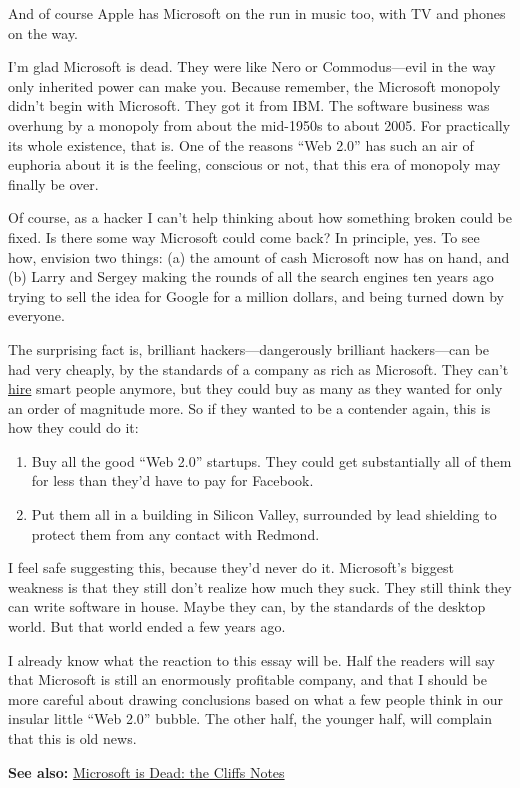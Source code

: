 And of course Apple has Microsoft on the run in music too, with TV and
phones on the way.

I'm glad Microsoft is dead. They were like Nero or Commodus---evil in
the way only inherited power can make you. Because remember, the
Microsoft monopoly didn't begin with Microsoft. They got it from IBM.
The software business was overhung by a monopoly from about the
mid-1950s to about 2005. For practically its whole existence, that is.
One of the reasons ``Web 2.0'' has such an air of euphoria about it is
the feeling, conscious or not, that this era of monopoly may finally be
over.

Of course, as a hacker I can't help thinking about how something broken
could be fixed. Is there some way Microsoft could come back? In
principle, yes. To see how, envision two things: (a) the amount of cash
Microsoft now has on hand, and (b) Larry and Sergey making the rounds of
all the search engines ten years ago trying to sell the idea for Google
for a million dollars, and being turned down by everyone.

The surprising fact is, brilliant hackers---dangerously brilliant
hackers---can be had very cheaply, by the standards of a company as rich
as Microsoft. They can't \href{hiring.html}{hire} smart people anymore,
but they could buy as many as they wanted for only an order of magnitude
more. So if they wanted to be a contender again, this is how they could
do it:

\begin{enumerate}
\def\labelenumi{\arabic{enumi}.}
\item
  Buy all the good ``Web 2.0'' startups. They could get substantially
  all of them for less than they'd have to pay for Facebook.
\item
  Put them all in a building in Silicon Valley, surrounded by lead
  shielding to protect them from any contact with Redmond.
\end{enumerate}

I feel safe suggesting this, because they'd never do it. Microsoft's
biggest weakness is that they still don't realize how much they suck.
They still think they can write software in house. Maybe they can, by
the standards of the desktop world. But that world ended a few years
ago.

I already know what the reaction to this essay will be. Half the readers
will say that Microsoft is still an enormously profitable company, and
that I should be more careful about drawing conclusions based on what a
few people think in our insular little ``Web 2.0'' bubble. The other
half, the younger half, will complain that this is old news.

\textbf{See also:} \href{cliffsnotes.html}{Microsoft is Dead: the Cliffs
Notes}